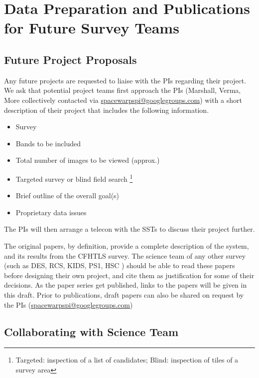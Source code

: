 \documentclass[a4paper]{article}
\begin{document}

\section{Data Preparation and Publications for Future Survey Teams}
\label{sec:series}

\subsection{Future Project Proposals}
Any future \sw projects are requested to liaise with the PIs regarding their project. We ask that potential project teams first approach the \sw PIs (Marshall, Verma, More collectively contacted via \href{mailto:spacewarpspi@googlegroups.com}{spacewarpspi@googlegroups.com}) with a short description of their project that includes the following information.

\begin{itemize}
\item Survey
\item Bands to be included
\item Total number of images to be viewed (approx.)
\item Targeted survey or blind field search \footnote{Targeted: inspection of a list of candidates; Blind: inspection of tiles of a survey area}
\item Brief outline of the overall goal(s)
\item Proprietary data issues 
\end{itemize}

The \sw PIs will then arrange a telecon with the SSTs to discuss their project further.

The original \sw papers, by definition, provide a complete description of the system, and its results from the CFHTLS survey. The science team of
any other survey (such as DES, RCS, KIDS, PS1, HSC \etc) should be able
to read these papers before designing their own \sw project, and cite them as justification for some of their decisions. As the \sw paper series get published, links to the papers will be given in this draft. Prior to publications, draft papers can also be shared on request by the \sw PIs (\href{mailto:spacewarpspi@googlegroups.com}{spacewarpspi@googlegroups.com})

\subsection{Collaborating with \sw Science Team}
\end{document}
